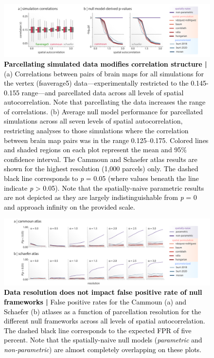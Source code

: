 \documentclass[12pt,aps,pra,reprint,showkeys]{revtex4-1}
\newcommand{\nimg}[1]{\textcolor{black}{{#1}}}
\begin{document}
\begin{figure}[htp]
  \begin{center}
    \centerline{\includegraphics[width=\textwidth]{simulation_corrs.png}}
    \caption{
      \nimg{\textbf{Parcellating simulated data modifies correlation structure |}
      (a) Correlations between pairs of brain maps for all simulations for the vertex (fsaverage5) data---experimentally restricted to the 0.145-0.155 range---and parcellated data across all levels of spatial autocorrelation.
      Note that parcellating the data increases the range of correlations.
      (b) Average null model performance for parcellated simulations across all seven levels of spatial autocorrelation, restricting analyses to those simulations where the correlation between brain map pairs was in the range 0.125--0.175.
      Colored lines and shaded regions on each plot represent the mean and 95\% confidence interval.
      The Cammoun and Schaefer atlas results are shown for the highest resolution (1,000 parcels) only.
      The dashed black line corresponds to \emph{p} = 0.05 (where values beneath the line indicate \emph{p} > 0.05).
      Note that the spatially-naive parametric results are not depicted as they are largely indistinguishable from \emph{p} = 0 and approach infinity on the provided scale.}
    }
    \label{supp-figure-simulation-correlations}
  \end{center}
\end{figure}

\begin{figure}[htp]
  \begin{center}
    \centerline{\includegraphics[width=\textwidth]{simulation_parcellated_results.png}}
    \caption{
      \nimg{\textbf{Data resolution does not impact false positive rate of null frameworks |}
      False positive rates for the Cammoun (a) and Schaefer (b) atlases as a function of parcellation resolution for the different null frameworks across all levels of spatial autocorrelation.
      The dashed black line corresponds to the expected FPR of five percent.
      Note that the spatially-naive null models (\textit{parametric} and \textit{non-parametric}) are almost completely overlapping on these plots.}
    }
    \label{supp-figure-simulation-parcellations}
  \end{center}
\end{figure}
\end{document}
